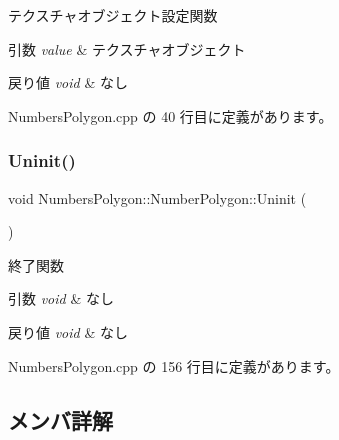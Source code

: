 テクスチャオブジェクト設定関数 


\begin{DoxyParams}{引数}
{\em value} & テクスチャオブジェクト \\
\hline
\end{DoxyParams}

\begin{DoxyRetVals}{戻り値}
{\em void} & なし \\
\hline
\end{DoxyRetVals}


 Numbers\+Polygon.\+cpp の 40 行目に定義があります。

\mbox{\label{class_numbers_polygon_1_1_number_polygon_ab0e804caf3778324516b7a8113cc1d39}} 
\subsubsection{\texorpdfstring{Uninit()}{Uninit()}}
{\footnotesize\ttfamily void Numbers\+Polygon\+::\+Number\+Polygon\+::\+Uninit (\begin{DoxyParamCaption}{ }\end{DoxyParamCaption})}



終了関数 


\begin{DoxyParams}{引数}
{\em void} & なし \\
\hline
\end{DoxyParams}

\begin{DoxyRetVals}{戻り値}
{\em void} & なし \\
\hline
\end{DoxyRetVals}


 Numbers\+Polygon.\+cpp の 156 行目に定義があります。



\subsection{メンバ詳解}
\mbox{\label{class_numbers_polygon_1_1_number_polygon_a026cdb72be813835b704e2628c287615}} 
